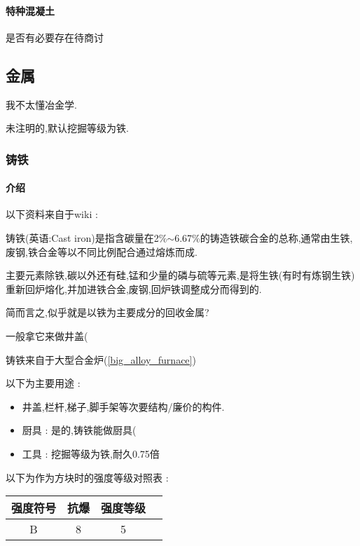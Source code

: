 {{{          \paragraph{特种混凝土}{
              是否有必要存在待商讨
          }
      }

  }

  \subsection{金属}{
      我不太懂冶金学.

      未注明的,默认挖掘等级为铁.

      \subsubsection{铸铁}{
          \paragraph{介绍}{
              以下资料来自于wiki :

              铸铁(英语:Cast iron)是指含碳量在2\%$\sim$6.67\%的铸造铁碳合金的总称,通常由生铁,废钢,铁合金等以不同比例配合通过熔炼而成.

              主要元素除铁,碳以外还有硅,锰和少量的磷与硫等元素,是将生铁(有时有炼钢生铁)重新回炉熔化,并加进铁合金,废钢,回炉铁调整成分而得到的.

              简而言之,似乎就是以铁为主要成分的回收金属?

              一般拿它来做井盖(
          }

          铸铁来自于大型合金炉({\ref{big_alloy_furnace}})

          以下为主要用途 :
          \begin{itemize}[itemsep=1pt]
              \item 井盖,栏杆,梯子,脚手架等次要结构/廉价的构件.
              \item 厨具 : 是的,铸铁能做厨具(
              \item 工具 : 挖掘等级为铁,耐久0.75倍
          \end{itemize}

          以下为作为方块时的强度等级对照表 :

          \begin{center}
              \begin{tabular}{|c|c|c|c|}
                  \hline
                  强度符号 & 抗爆   & 强度等级 \\
                  \hline
                  B        & 8      & 5      \\
                  \hline
              \end{tabular}
          \end{center}


}}}
